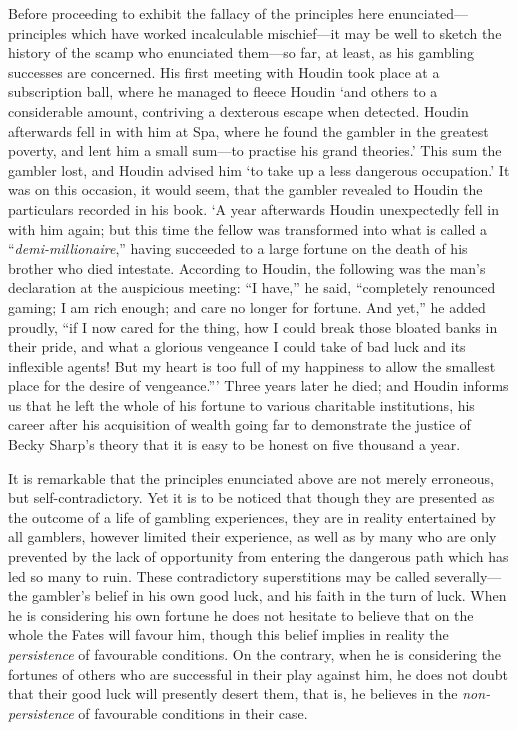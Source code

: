 \documentclass[letterpaper,12pt,oneside,openany]{memoir}
\begin{document}
Before proceeding to exhibit the fallacy of the principles
here enunciated---principles which have worked
incalculable mischief---it may be well to sketch the
history of the scamp who enunciated them---so far, at
least, as his gambling successes are concerned. His
first meeting with Houdin took place at a subscription
ball, where he managed to fleece Houdin `and
others to a considerable amount, contriving a dexterous
escape when detected. Houdin afterwards fell in with
him at Spa, where he found the gambler in the greatest
poverty, and lent him a small sum---to practise his
grand theories.' This sum the gambler lost, and
Houdin advised him `to take up a less dangerous occupation.'
It was on this occasion, it would seem, that
the gambler revealed to Houdin the particulars recorded
in his book. `A year afterwards Houdin unexpectedly
fell in with him again; but this time the
fellow was transformed into what is called a ``\textit{demi-millionaire},''
having succeeded to a large fortune on
the death of his brother who died intestate. According
to Houdin, the following was the man's declaration
at the auspicious meeting: ``I have,'' he said, ``completely
renounced gaming; I am rich enough; and
care no longer for fortune. And yet,'' he added proudly,
``if I now cared for the thing, how I could break those
bloated banks in their pride, and what a glorious
vengeance I could take of bad luck and its inflexible
agents! But my heart is too full of my happiness to
allow the smallest place for the desire of vengeance.'''
Three years later he died; and Houdin informs us that
he left the whole of his fortune to various charitable
institutions, his career after his acquisition of wealth
going far to demonstrate the justice of Becky Sharp's
theory that it is easy to be honest on five thousand a
year.

It is remarkable that the principles enunciated above
are not merely erroneous, but self-contradictory. Yet
it is to be noticed that though they are presented as
the outcome of a life of gambling experiences, they
are in reality entertained by all gamblers, however
limited their experience, as well as by many who are
only prevented by the lack of opportunity from entering
the dangerous path which has led so many to
ruin. These contradictory superstitions may be called
severally---the gambler's belief in his own good luck,
and his faith in the turn of luck. When he is considering
his own fortune he does not hesitate to believe
that on the whole the Fates will favour him, though
this belief implies in reality the \textit{persistence} of favourable
conditions. On the contrary, when he is considering
the fortunes of others who are successful in their play
against him, he does not doubt that their good luck
will presently desert them, that is, he believes in the
\textit{non-persistence} of favourable conditions in their case.
\end{document}
